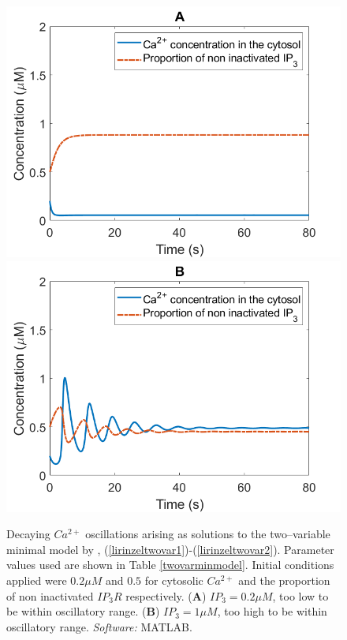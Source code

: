 \begin{figure}[!htb]
\centering
{}
  \includegraphics[width=\linewidth]{Chapters/2_Ca2+_Models/extras/twovarlow.png}
\endminipage\hfill\\
  \includegraphics[width=\linewidth]{Chapters/2_Ca2+_Models/extras/twovarhigh.png}
\endminipage\hfill
\caption{Decaying $Ca^{2+}$ oscillations arising as solutions to the two--variable minimal model by , (\ref{lirinzeltwovar1})-(\ref{lirinzeltwovar2}). Parameter values used are shown in Table \ref{twovarminmodel}. Initial conditions applied were $0.2\mu M$ and $0.5$ for cytosolic $Ca^{2+}$ and the proportion of non inactivated $IP_3R$ respectively. (\textbf{A}) $IP_3=0.2\mu M$, too low to be within oscillatory range. (\textbf{B}) $IP_3=1\mu M$, too high to be within oscillatory range. \textit{Software:} MATLAB.}\label{twovarlowhigh}
\end{figure}

